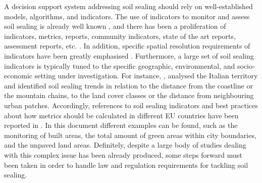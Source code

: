\documentclass[APA,LATO1COL,doublespace]{WileyNJD-v2}
\begin{document}
A decision support system addressing soil sealing should rely on well-established models, algorithms, and indicators. The use of indicators to monitor and assess soil sealing is already well known \citep{King16}, and there has been a proliferation of indicators, metrics, reports, community indicators, state of the art reports, assessment reports, etc. \citep{Maclaren96,Tanguay10}.
In addition, specific spatial resolution requirements of indicators have been greatly emphasised \citep{Jaeger08}.
Furthermore, a large set of soil sealing indicators is typically tuned to the specific geographic, environmental, and socio-economic setting under investigation.
For instance, \citet{Munafo13}, analysed the Italian territory and identified soil sealing trends in relation to the distance from the coastline or the mountain chains, to the land cover classes or the distance from neighbouring urban patches.
Accordingly, references to soil sealing indicators and best practices about how metrics should be calculated in different EU countries have been reported in \citep{EC2011b}.
In this document different examples can be found, such as the monitoring of built areas, the total amount of green areas within city boundaries, and the unpaved land areas.
Definitely, despite a large body of studies dealing with this complex issue has been already produced, some steps forward must been taken in order to handle law and regulation requirements for tackling soil sealing.
\end{document}
